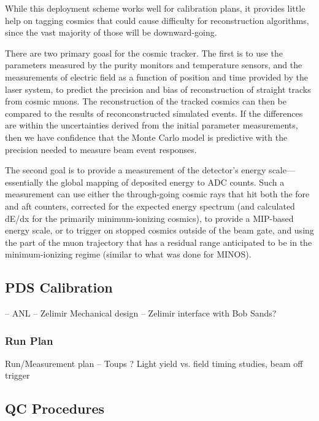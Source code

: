 	While this deployment scheme works well for calibration plans, it
provides little help on tagging cosmics that could cause difficulty for
reconstruction algorithms, since the vast majority of those will be
downward-going.  

	There are two primary goasl for the cosmic tracker. The first is to use
the parameters measured by the purity monitors and temperature sensors, and the
measurements of electric field as a function of position and time provided by
the laser system, to predict the precision and bias of reconstruction of
straight tracks from cosmic muons. The reconstruction of the tracked cosmics
can then be compared to the results of reconconstructed simulated events. If
the differences are within the uncertainties derived from the initial parameter
measurements, then we have confidence that the Monte Carlo model is predictive
with the precision needed to measure beam event responses.  

	The second goal is to provide a measurement of the detector's energy
scale---essentially the global mapping of deposited energy to ADC counts.  Such
a measurement can use either the through-going cosmic rays that hit both the
fore and aft counters, corrected for the expected energy spectrum (and
calculated dE/dx for the primarily minimum-ionizing cosmics), to provide a
MIP-based energy scale, or to trigger on stopped cosmics outside of the beam
gate, and using the part of the muon trajectory that has a residual range
anticipated to be in the minimum-ionizing regime (similar to what was done for
MINOS).  
	

\subsection{PDS Calibration} -- ANL -- Zelimir
     Mechanical design -- Zelimir interface with Bob Sands?

\subsubsection{Run Plan}
     Run/Measurement plan  -- Toups ?
     Light yield vs. field
     timing studies,
     beam off trigger

\subsection{QC Procedures}

